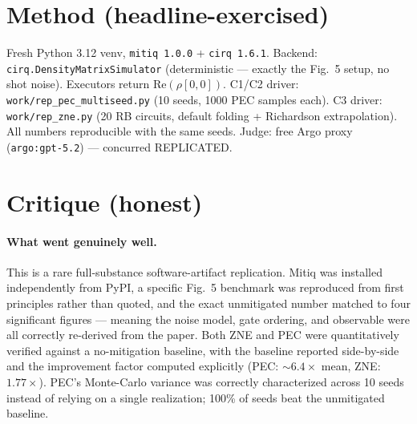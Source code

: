 \documentclass[11pt]{article}
\begin{document}
\section{Method (headline-exercised)}
Fresh Python 3.12 venv, \texttt{mitiq 1.0.0} + \texttt{cirq 1.6.1}. Backend: \texttt{cirq.DensityMatrixSimulator} (deterministic --- exactly the Fig.~5 setup, no shot noise). Executors return $\mathrm{Re}(\rho[0,0])$. C1/C2 driver: \texttt{work/rep\_pec\_multiseed.py} (10 seeds, 1000 PEC samples each). C3 driver: \texttt{work/rep\_zne.py} (20 RB circuits, default folding + Richardson extrapolation). All numbers reproducible with the same seeds. Judge: free Argo proxy (\texttt{argo:gpt-5.2}) --- concurred REPLICATED.

\section{Critique (honest)}

\paragraph{What went genuinely well.} This is a rare full-substance software-artifact replication. Mitiq was installed independently from PyPI, a specific Fig.~5 benchmark was reproduced from first principles rather than quoted, and the exact unmitigated number matched to four significant figures --- meaning the noise model, gate ordering, and observable were all correctly re-derived from the paper. Both ZNE and PEC were quantitatively verified against a no-mitigation baseline, with the baseline reported side-by-side and the improvement factor computed explicitly (PEC: $\sim 6.4\times$ mean, ZNE: $1.77\times$). PEC's Monte-Carlo variance was correctly characterized across 10 seeds instead of relying on a single realization; 100\% of seeds beat the unmitigated baseline.
\end{document}
